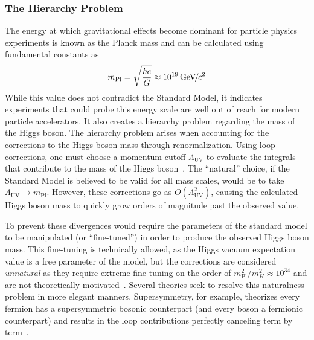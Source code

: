 \subsubsection{The Hierarchy Problem} \label{sec:hierarchy}
The energy at which gravitational effects become dominant for particle physics experiments is known as the Planck mass and can be calculated using fundamental constants as
\begin{equation}
	m_\text{Pl}=\sqrt{\frac{\hbar c}{G}}\approx10^{19}{\,\text{Ge\hspace{-.08em}V\hspace{-0.16em}/\hspace{-0.08em}}c^\text{2}}
\end{equation}
While this value does not contradict the Standard Model, it indicates experiments that could probe this energy scale are well out of reach for modern particle accelerators. It also creates a hierarchy problem regarding the mass of the Higgs boson. The hierarchy problem arises when accounting for the corrections to the Higgs boson mass through renormalization. Using loop corrections, one must choose a momentum cutoff $\Lambda_\text{UV}$ to evaluate the integrals that contribute to the mass of the Higgs boson~\cite{Peskin:1995ev}. The ``natural'' choice, if the Standard Model is believed to be valid for all mass scales, would be to take $\Lambda_\text{UV}\to m_\text{Pl}$. However, these corrections go as $O(\Lambda_\text{UV}^2)$, causing the calculated Higgs boson mass to quickly grow orders of magnitude past the observed value.

To prevent these divergences would require the parameters of the standard model to be manipulated (or ``fine-tuned'') in order to produce the observed Higgs boson mass. This fine-tuning is technically allowed, as the Higgs vacuum expectation value is a free parameter of the model, but the corrections are considered \textit{unnatural} as they require extreme fine-tuning on the order of $m_\text{Pl}^2/m_H^2\approx10^{34}$ and are not theoretically motivated~\cite{hierarchy}. Several theories seek to resolve this naturalness problem in more elegant manners. Supersymmetry, for example, theorizes every fermion has a supersymmetric bosonic counterpart (and every boson a fermionic counterpart) and results in the loop contributions perfectly canceling term by term~\cite{susy}.


